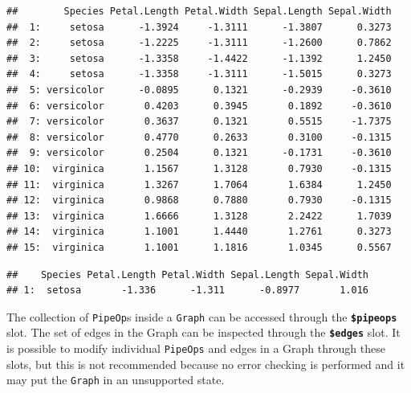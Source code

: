 \documentclass[
]{scrbook}
\newenvironment{Shaded}{\begin{snugshade}}{\end{snugshade}}
\newcommand{\DecValTok}[1]{\textcolor[rgb]{0.00,0.00,0.81}{#1}}
\newcommand{\FunctionTok}[1]{\textcolor[rgb]{0.00,0.00,0.00}{#1}}
\newcommand{\NormalTok}[1]{#1}
\newcommand{\SpecialCharTok}[1]{\textcolor[rgb]{0.00,0.00,0.00}{#1}}
\renewenvironment{Shaded} {\begin{snugshade}\small} {\end{snugshade}}
\begin{document}
\begin{Shaded}
\end{Shaded}

\begin{verbatim}
##        Species Petal.Length Petal.Width Sepal.Length Sepal.Width
##  1:     setosa      -1.3924     -1.3111      -1.3807      0.3273
##  2:     setosa      -1.2225     -1.3111      -1.2600      0.7862
##  3:     setosa      -1.3358     -1.4422      -1.1392      1.2450
##  4:     setosa      -1.3358     -1.3111      -1.5015      0.3273
##  5: versicolor      -0.0895      0.1321      -0.2939     -0.3610
##  6: versicolor       0.4203      0.3945       0.1892     -0.3610
##  7: versicolor       0.3637      0.1321       0.5515     -1.7375
##  8: versicolor       0.4770      0.2633       0.3100     -0.1315
##  9: versicolor       0.2504      0.1321      -0.1731     -0.3610
## 10:  virginica       1.1567      1.3128       0.7930     -0.1315
## 11:  virginica       1.3267      1.7064       1.6384      1.2450
## 12:  virginica       0.9868      0.7880       0.7930     -0.1315
## 13:  virginica       1.6666      1.3128       2.2422      1.7039
## 14:  virginica       1.1001      1.4440       1.2761      0.3273
## 15:  virginica       1.1001      1.1816       1.0345      0.5567
\end{verbatim}

\begin{Shaded}
\end{Shaded}

\begin{verbatim}
##    Species Petal.Length Petal.Width Sepal.Length Sepal.Width
## 1:  setosa       -1.336      -1.311      -0.8977       1.016
\end{verbatim}

The collection of \texttt{PipeOp}s inside a \texttt{Graph} can be accessed through the \textbf{\texttt{\$pipeops}} slot.
The set of edges in the Graph can be inspected through the \textbf{\texttt{\$edges}} slot.
It is possible to modify individual \texttt{PipeOps} and edges in a Graph through these slots, but this is not recommended because no error checking is performed and it may put the \texttt{Graph} in an unsupported state.
\end{document}
